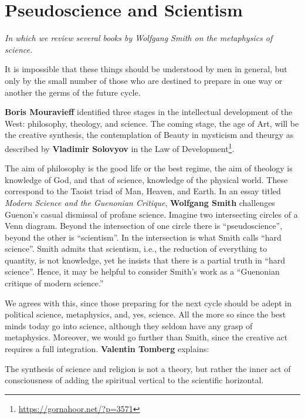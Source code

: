 \section{Pseudoscience and Scientism}

\emph{In which we review several books by Wolfgang Smith on the metaphysics of science.}

\begin{quotex}
It is impossible that these things should be understood by men in general, but only by the small number of those who are destined to prepare in one way or another the germs of the future cycle.
\end{quotex}


\textbf{Boris Mouravieff} identified three stages in the intellectual development of the West: philosophy, theology, and science. The coming stage, the age of Art, will be the creative synthesis, the contemplation of Beauty in mysticism and theurgy as described by \textbf{Vladimir Solovyov} in the Law of Development\footnote{\url{https://gornahoor.net/?p=3571}}.

The aim of philosophy is the good life or the best regime, the aim of theology is knowledge of God, and that of science, knowledge of the physical world. These correspond to the Taoist triad of Man, Heaven, and Earth. In an essay titled \textit{Modern Science and the Guenonian Critique}, \textbf{Wolfgang Smith} challenges Guenon's casual dismissal of profane science. Imagine two intersecting circles of a Venn diagram. Beyond the intersection of one circle there is ``pseudoscience'', beyond the other is ``scientism''. In the intersection is what Smith calls ``hard science''. Smith admits that scientism, i.e., the reduction of everything to quantity, is not knowledge, yet he insists that there is a partial truth in ``hard science''. Hence, it may be helpful to consider Smith's work as a ``Guenonian critique of modern science.''

We agrees with this, since those preparing for the next cycle should be adept in political science, metaphysics, and, yes, science. All the more so since the best minds today go into science, although they seldom have any grasp of metaphysics. Moreover, we would go further than Smith, since the creative act requires a full integration. \textbf{Valentin Tomberg} explains:

\begin{quotex}
The synthesis of science and religion is not a theory, but rather the inner act of consciousness of adding the spiritual vertical to the scientific horizontal.
\end{quotex}


